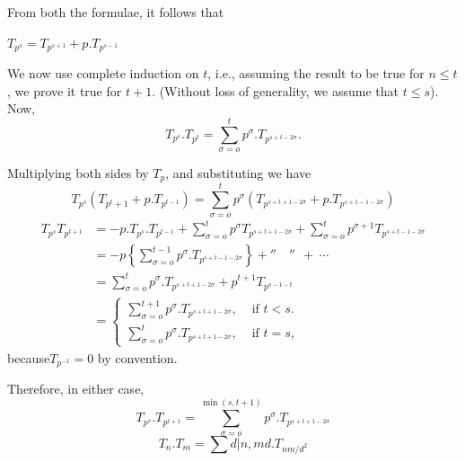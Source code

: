 From both the formulae, it follows that
\begin{center}
  \begin{fbox} 
    {$ T_{p^s} = T_{p^{s+1}} + p. T_{p^{s-1}}$} 
  \end{fbox}
\end{center}

We now use complete induction on $t$, i.e.,  assuming the result to be
true for $n \le t$, we prove it true for $t + 1$. (Without loss of
generality, we assume that $t \le s$). Now, 
$$
T_{p^s}. T_{p^t} = \sum_{\sigma = o}^{t} p^\sigma. T_{p^{s+t-2\sigma}}.
$$

Multiplying both sides by $T_p$, and substituting we have
$$
T_{p^s} (T_{p^t+1} + p. T_{p^{t-1}}) = \sum_{\sigma = o}^{t} p^\sigma
(T_{p^{s+t+1-2 \sigma }}+ p. T_{p^{s+1 - 1 - 2 \sigma}}) 
$$
\begin{align*}
  T_{p^{s}} T_{p^{t+1}} & = - p.T_{p^s}. T_{p^{t-1}} + \sum_{\sigma =
    o}^t p^\sigma T_{p^{s+t+1-2 \sigma}} + \sum_{\sigma = o}^t
  p^{\sigma + 1} T_{p^{s+t-1-2 \sigma}}\\ 
  & = - p \left\{ \sum_{\sigma = o}^{t-1}
  p^\sigma. T_{p^{s+t-1-2\sigma}}\right\} + '' \quad '' ~~ + ~ \cdots\\ 
  & = \sum_{\sigma = o}^t p^\sigma. T_{p^{s+t+1-2 \sigma}} +  p^{t+1} T_{p^{s-1-t}}\\
  & = 
  \begin{cases}
    \sum_{\sigma = o}^{t+1} p^\sigma.  T_{p^{s+t+1-2 \sigma}}, & \text { if } t < s. \\
    \sum_{\sigma = o}^t p^\sigma. T_{p^{s+t+1-2 \sigma}}, & \text { if } t = s,
  \end{cases}
\end{align*}
because\pageoriginale $T_{p^{-1}} = 0$ by convention.

Therefore, in either case,
$$
T_{p^s}. T_{p^{t+1}} = \sum_{\sigma = o}^{\min (s, t + 1)} p^\sigma. T_{p^{s+t+1-2 \sigma}}
$$
\begin{equation}
  T_n.  T_m = \sum{d | n, m} d.T_{n m / d^2} \tag{4}
\end{equation}

